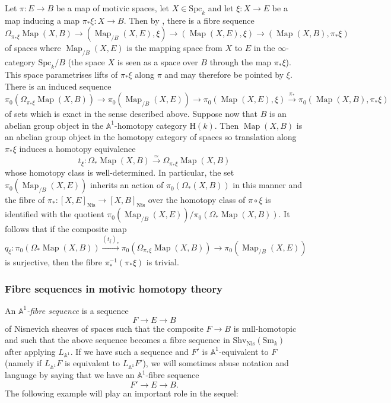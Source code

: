 \documentclass[11pt,leqno]{amsart}
\renewcommand{\1}{{\rm 1\hspace*{-0.4ex}%
\rule{0.1ex}{1.52ex}\hspace*{0.2ex}}}
\newcommand{\Nis}{{\operatorname{Nis}}}
\newcommand{\Shv}{{\mathrm{Shv}}}
\newcommand{\Sm}{\mathrm{Sm}}
\newcommand{\Spc}{\mathrm{Spc}}
\newcommand{\Hr}{{\mathrm {H}}}
\newcommand{\<}[1]{{\langle}#1 {\rangle}}
\newcommand{\Abb}{\mathbb{A}}
\newcommand{\Map}{\operatorname{Map}}
\theoremstyle{plain}
\theoremstyle{definition}
\theoremstyle{remark}
\numberwithin{equation}{section}
\begin{document}
Let $\pi:E\to B$ be a map of motivic spaces, let $X\in\Spc_k$ and let $\xi:X\to E$ be a map inducing a map $\pi_*\xi:X\to B$. 
Then by \cite[Lemma 5.5.5.12]{lurieHigherToposTheory2009}, there is a fibre sequence \[\Omega_{\pi_*\xi}\Map(X,B)\to(\Map_{/B}(X,E),\xi)\to(\Map(X,E),\xi)\to(\Map(X,B),\pi_*\xi)\] of spaces where $\Map_{/B}(X,E)$ is the mapping space from $X$ to $E$ in the $\infty$-category $\Spc_k/B$ (the space $X$ is seen as a space over $B$ through the map $\pi_*\xi$). This space parametrises lifts of $\pi_*\xi$ along $\pi$ and may therefore be pointed by $\xi$. There is an induced sequence \[\pi_0(\Omega_{\pi_*\xi}\Map(X,B))\to\pi_0(\Map_{/B}(X,E))\to\pi_0(\Map(X,E),\xi)\xrightarrow{\pi_*}\pi_0(\Map(X,B),\pi_*\xi)\] of sets which is exact in the sense described above. Suppose now that $B$ is an abelian group object in the $\Abb^1$-homotopy category $\Hr(k)$. Then $\Map(X,B)$ is an abelian group object in the homotopy category of spaces so translation along $\pi_*\xi$ induces a homotopy equivalence \[t_\xi:\Omega_*\Map(X,B)\xrightarrow{\simeq}\Omega_{\pi_*\xi}\Map(X,B)\] whose homotopy class is well-determined. In particular, the set $\pi_0(\Map_{/B}(X,E))$ inherits an action of $\pi_0(\Omega_*(X,B))$ in this manner and the fibre of $\pi_*:[X,E]_{\Nis}\to[X,B]_{\Nis}$ over the homotopy class of $\pi\circ\xi$ is identified with the quotient $\pi_0(\Map_{/B}(X,E))/\pi_0(\Omega_*\Map(X,B))$. It follows that if the composite map \[q_\xi:\pi_0(\Omega_*\Map(X,B))\xrightarrow{(t_\xi)_*}\pi_0(\Omega_{\pi_*\xi}\Map(X,B))\to\pi_0(\Map_{/B}(X,E))\] is surjective, then the fibre $\pi_*^{-1}(\pi_*\xi)$ is trivial. 

\subsubsection*{Fibre sequences in motivic homotopy theory}

An \emph{$\Abb^1$-fibre sequence} is a sequence \[F\rightarrow E\rightarrow B\] of Nisnevich sheaves of spaces such that the composite $F\rightarrow B$ is null-homotopic and such that the above sequence becomes a fibre sequence in $\Shv_\Nis(\Sm_k)$ after applying $L_{\Abb^1}$. If we have such a sequence and $F'$ is $\Abb^1$-equivalent to $F$ (namely if $L_{\Abb^1}F$ is equivalent to $L_{\Abb^1}F'$), we will sometimes abuse notation and language by saying that we have an $\Abb^1$-fibre sequence \[F'\rightarrow E\rightarrow B.\] The following example will play an important role in the sequel:
\end{document}
